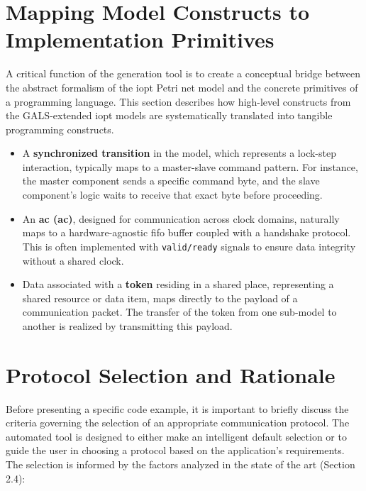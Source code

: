 \section{Mapping Model Constructs to Implementation Primitives}
\label{sec:mapping_constructs}

A critical function of the generation tool is to create a conceptual bridge between the abstract formalism of the \gls{iopt} Petri net model and the concrete primitives of a programming language. This section describes how high-level constructs from the GALS-extended \gls{iopt} models are systematically translated into tangible programming constructs.

\begin{itemize}
    \item A \textbf{synchronized transition} in the model, which represents a lock-step interaction, typically maps to a master-slave command pattern. For instance, the master component sends a specific command byte, and the slave component's logic waits to receive that exact byte before proceeding.
    \item An \textbf{\gls{ac} (\gls{ac})}, designed for communication across clock domains, naturally maps to a hardware-agnostic \gls{fifo} buffer coupled with a handshake protocol. This is often implemented with \texttt{valid/ready} signals to ensure data integrity without a shared clock.
    \item Data associated with a \textbf{token} residing in a shared place, representing a shared resource or data item, maps directly to the payload of a communication packet. The transfer of the token from one sub-model to another is realized by transmitting this payload.
\end{itemize}

\section{Protocol Selection and Rationale}
\label{sec:protocol_rationale}

Before presenting a specific code example, it is important to briefly discuss the criteria governing the selection of an appropriate communication protocol. The automated tool is designed to either make an intelligent default selection or to guide the user in choosing a protocol based on the application's requirements. The selection is informed by the factors analyzed in the state of the art (Section 2.4):


